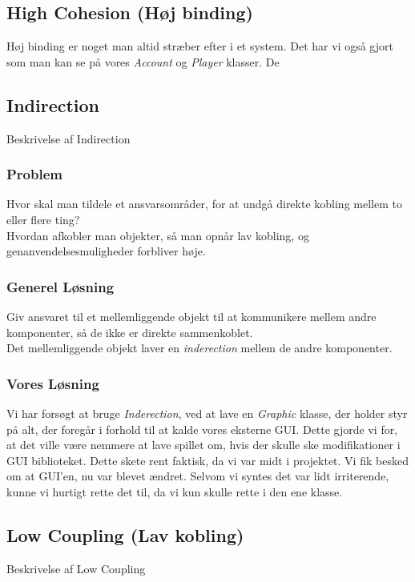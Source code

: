 \subsection{High Cohesion (Høj binding)}
Høj binding er noget man altid stræber efter i et system. Det har vi også gjort som man kan se på vores \textit{Account} og \textit{Player} klasser. De
\subsection{Indirection}
Beskrivelse af Indirection
\subsubsection*{Problem}
Hvor skal man tildele et ansvarsområder, for at undgå direkte kobling mellem to eller flere ting?
\\
Hvordan afkobler man objekter, så man opnår lav kobling, og genanvendelsesmuligheder forbliver høje.
\subsubsection*{Generel Løsning}
Giv ansvaret til et mellemliggende objekt til at kommunikere mellem andre komponenter, så de ikke er direkte sammenkoblet.
\\
Det mellemliggende objekt laver en \textit{inderection} mellem de andre komponenter.
\subsubsection*{Vores Løsning}
Vi har forsøgt at bruge \textit{Inderection}, ved at lave en \textit{Graphic} klasse, der holder styr på alt, der foregår i forhold til at kalde vores eksterne GUI. Dette gjorde vi for, at det ville være nemmere at lave spillet om, hvis der skulle ske modifikationer i GUI biblioteket. Dette skete rent faktisk, da vi var midt i projektet. Vi fik besked om at GUI'en, nu var blevet ændret. Selvom vi syntes det var lidt irriterende, kunne vi hurtigt rette det til, da vi kun skulle rette i den ene klasse.
\subsection{Low Coupling (Lav kobling)}
Beskrivelse af Low Coupling
